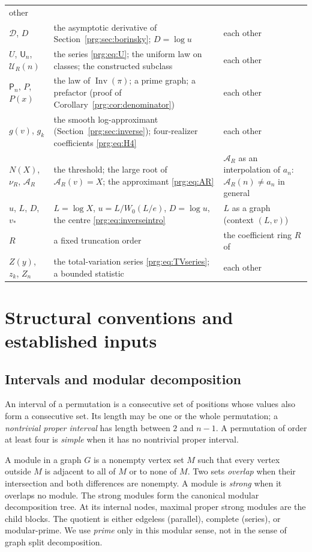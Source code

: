 \documentclass[11pt,letterpaper]{article}
\numberwithin{equation}{section}
\theoremstyle{definition}\newtheorem{definition}[theorem]{Definition}
\theoremstyle{remark}\newtheorem{remark}[theorem]{Remark}
\DeclareMathOperator{\Inv}{Inv}
\begin{document}
\begin{minipage}{\textwidth}
\begin{tabular}{@{}>{\raggedright\arraybackslash}p{0.95in}>{\raggedright\arraybackslash}p{3.25in}>{\raggedright\arraybackslash}p{1.95in}@{}}
 other\\
$\mathcal D$, $D$ & the asymptotic derivative of Section~\ref{prg:sec:borinsky};
 $D=\log u$ & each other\\
$U$, $\mathsf U_n$, $\mathcal U_R(n)$ & the series \eqref{prg:eq:U}; the
 uniform law on classes; the constructed subclass & each other\\
$\mathsf P_n$, $P$, $P(x)$ & the law of $\Inv(\pi)$; a prime graph; a
 prefactor (proof of Corollary~\ref{prg:cor:denominator}) & each other\\
$g(v)$, $g_k$ & the smooth log-approximant (Section~\ref{prg:sec:inverse});
 four-realizer coefficients \eqref{prg:eq:H4} & each other\\
$N(X)$, $\nu_R$, $\mathcal A_R$ & the threshold; the large root of
 $\mathcal A_R(v)=X$; the approximant \eqref{prg:eq:AR} & $\mathcal A_R$ as an
 interpolation of $a_n$: $\mathcal A_R(n)\ne a_n$ in general\\
$u$, $L$, $D$, $v_*$ & $L=\log X$, $u=L/W_0(L/e)$, $D=\log u$, the centre
 \eqref{prg:eq:inverseintro} & $L$ as a graph (context $(L,v)$)\\
$R$ & a fixed truncation order & the coefficient ring $R$ of~\cite{TSI}\\
$Z(y)$, $z_k$, $Z_n$ & the total-variation series \eqref{prg:eq:TVseries}; a
 bounded statistic & each other\\
\bottomrule
\end{tabular}
\endgroup
\end{minipage}

\section{Structural conventions and established inputs}\label{prg:sec:inputs}

\subsection{Intervals and modular decomposition}
An interval of a permutation is a consecutive set of positions whose
values also form a consecutive set. Its length may be one or the
whole permutation; a \emph{nontrivial proper interval} has length
between $2$ and $n-1$. A permutation of order at least four is
\emph{simple} when it has no nontrivial proper interval.

A module in a graph $G$ is a nonempty vertex set $M$ such that every
vertex outside $M$ is adjacent to all of $M$ or to none of $M$.
Two sets \emph{overlap} when their intersection and both differences
are nonempty. A module is \emph{strong} when it overlaps no module.
The strong modules form the canonical modular decomposition tree.
At its internal nodes, maximal proper strong modules are the child
blocks. The quotient is either edgeless (parallel), complete
(series), or modular-prime. We use \emph{prime} only in this modular
sense, not in the sense of graph split decomposition.
\end{document}
